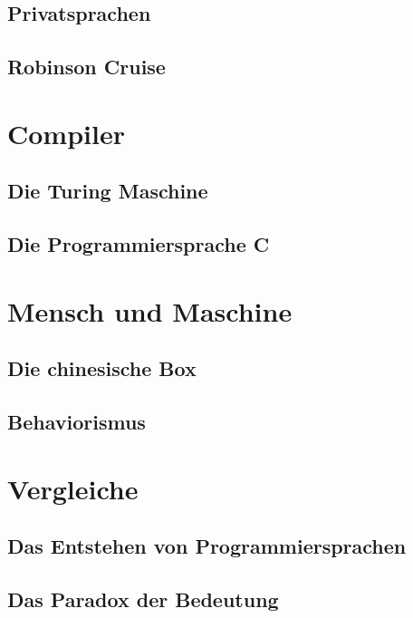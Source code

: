 \documentclass[a4paper,12pt]{article}
\begin{document}
\subsection{Privatsprachen}
\blindtext[1]

\subsection{Robinson Cruise}
\blindtext[1]


\section{Compiler}
\blindtext[1]

\subsection{Die Turing Maschine}
\blindtext[1]

\subsection{Die Programmiersprache C}
\blindtext[1]


\section{Mensch und Maschine}
\blindtext[1]

\subsection{Die chinesische Box}
\blindtext[1]

\subsection{Behaviorismus}
\blindtext[1]


\section{Vergleiche}
\blindtext[1]

\subsection{Das Entstehen von Programmiersprachen}
\blindtext[1]

\subsection{Das Paradox der Bedeutung}
\blindtext[1]
\end{document}
